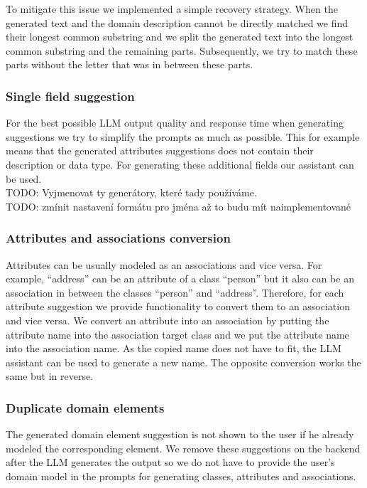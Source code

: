 To mitigate this issue we implemented a simple recovery strategy. When the generated text and the domain description cannot be directly matched we find their longest common substring and we split the generated text into the longest common substring and the remaining parts. Subsequently, we try to match these parts without the letter that was in between these parts.


\subsubsection{Single field suggestion}

For the best possible LLM output quality and response time when generating suggestions we try to simplify the prompts as much as possible. This for example means that the generated attributes suggestions does not contain their description or data type. For generating these additional fields our assistant can be used. \\

TODO: Vyjmenovat ty generátory, které tady používáme. \\

TODO: zmínit nastavení formátu pro jména až to budu mít naimplementované \\


\subsubsection{Attributes and associations conversion}

Attributes can be usually modeled as an associations and vice versa. For example, ``address'' can be an attribute of a class ``person'' but it also can be an association in between the classes ``person'' and ``address''. Therefore, for each attribute suggestion we provide functionality to convert them to an association and vice versa. We convert an attribute into an association by putting the attribute name into the association target class and we put the attribute name into the association name. As the copied name does not have to fit, the LLM assistant can be used to generate a new name. The opposite conversion works the same but in reverse.


\subsubsection{Duplicate domain elements}
\label{duplicate_domain_elements}
The generated domain element suggestion is not shown to the user if he already modeled the corresponding element. We remove these suggestions on the backend after the LLM generates the output so we do not have to provide the user's domain model in the prompts for generating classes, attributes and associations.

